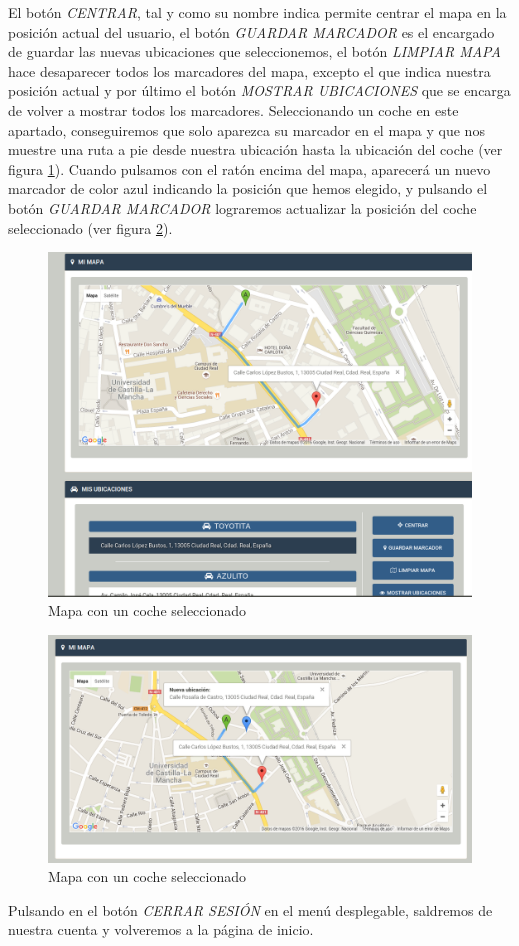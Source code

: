 	El botón \textit{CENTRAR}, tal y como su nombre indica permite centrar el mapa en la posición actual del usuario, el botón \textit{GUARDAR MARCADOR} es el encargado de guardar las nuevas ubicaciones que seleccionemos, el botón \textit{LIMPIAR MAPA} hace desaparecer todos los marcadores del mapa, excepto el que indica nuestra posición actual y por último el botón \textit{MOSTRAR UBICACIONES} que se encarga de volver a mostrar todos los marcadores.
	Seleccionando un coche en este apartado, conseguiremos que solo aparezca su marcador en el mapa y que nos muestre una ruta a pie desde nuestra ubicación hasta la ubicación del coche (ver figura \ref{fig:my-map3}).
	Cuando pulsamos con el ratón encima del mapa, aparecerá un nuevo marcador de color azul indicando la posición que hemos elegido, y pulsando el botón \textit{GUARDAR MARCADOR} lograremos actualizar la posición del coche seleccionado (ver figura \ref{fig:my-map4}).

	\begin{figure}[h!]
		\centering
		\includegraphics[width=15cm, fbox={\fboxrule} 4mm]{images/06-manual/12-my_maps3.png}
		\caption{Mapa con un coche seleccionado}
		\label{fig:my-map3}
	\end{figure}
	
	\begin{figure}[h!]
		\centering
		\includegraphics[width=15cm, fbox={\fboxrule} 4mm]{images/06-manual/13-my_maps4.png}
		\caption{Mapa con un coche seleccionado}
		\label{fig:my-map4}
	\end{figure}
	
	Pulsando en el botón \textit{CERRAR SESIÓN} en el menú desplegable, saldremos de nuestra cuenta y volveremos a la página de inicio.
	
